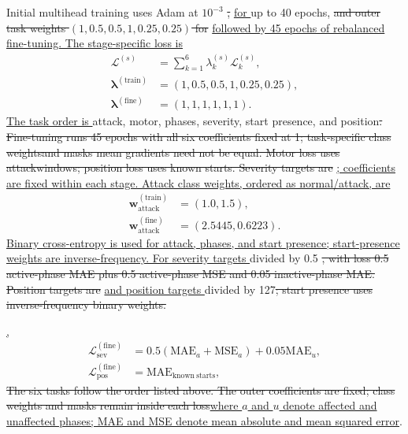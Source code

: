 \documentclass[conference,letterpaper]{IEEEtran}
\providecommand{\DIFadd}[1]{{\protect\color{blue}\uline{#1}}} %
\providecommand{\DIFdel}[1]{{\protect\color{red}\sout{#1}}}                      %
\providecommand{\DIFaddbegin}{} %
\providecommand{\DIFaddend}{} %
\providecommand{\DIFdelbegin}{} %
\providecommand{\DIFdelend}{} %
\begin{document}
Initial multihead training uses Adam at $10^{-3}$ \DIFdelbegin \DIFdel{, }\DIFdelend \DIFaddbegin \DIFadd{for }\DIFaddend up to 40 epochs, \DIFdelbegin \DIFdel{and outer task weights $(1,0.5,0.5,1,0.25,0.25)$ for }\DIFdelend \DIFaddbegin \DIFadd{followed by 45 epochs of rebalanced fine-tuning. The stage-specific loss is
}\begin{equation}
\begin{aligned}
\mathcal{L}^{(s)} &= \sum_{k=1}^{6}\lambda_k^{(s)}\mathcal{L}_k^{(s)},\\
\boldsymbol{\lambda}^{(\mathrm{train})} &= (1,0.5,0.5,1,0.25,0.25),\\
\boldsymbol{\lambda}^{(\mathrm{fine})} &= (1,1,1,1,1,1).
\end{aligned}
\label{eq:multitask_loss}
\end{equation}
\DIFadd{The task order is }\DIFaddend attack, motor, phases, severity, start presence, and position\DIFdelbegin \DIFdel{. Fine-tuning runs 45 epochs with all six coefficients fixed at 1; task-specific class weightsand masks mean gradients need not be equal. Motor loss uses attackwindows; position loss uses known starts. Severity targets are }\DIFdelend \DIFaddbegin \DIFadd{; coefficients are fixed within each stage. Attack class weights, ordered as normal/attack, are
}\begin{equation}
\begin{aligned}
\mathbf{w}_{\mathrm{attack}}^{(\mathrm{train})} &= (1.0,1.5),\\
\mathbf{w}_{\mathrm{attack}}^{(\mathrm{fine})} &= (2.5445,0.6223).
\end{aligned}
\label{eq:attack_weights}
\end{equation}
\DIFadd{Binary cross-entropy is used for attack, phases, and start presence; start-presence weights are inverse-frequency. For severity targets }\DIFaddend divided by 0.5 \DIFdelbegin \DIFdel{, with loss 0.5 active-phase MAE plus 0.5 active-phase MSE and 0.05 inactive-phase MAE. Position targets are }\DIFdelend \DIFaddbegin \DIFadd{and position targets }\DIFaddend divided by 127\DIFdelbegin \DIFdel{; start presence uses inverse-frequency binary weights.
}%

\DIFdelend \DIFaddbegin \DIFadd{,
}\begin{equation}
\begin{aligned}
\mathcal{L}_{\mathrm{sev}}^{(\mathrm{fine})} &= 0.5(\mathrm{MAE}_{a}+\mathrm{MSE}_{a})+0.05\mathrm{MAE}_{u},\\
\mathcal{L}_{\mathrm{pos}}^{(\mathrm{fine})} &= \mathrm{MAE}_{\mathrm{known\ starts}},
\end{aligned}
\end{equation}\DIFaddend
\DIFdelbegin \DIFdel{The six tasks follow the order listed above. The outer coefficients are fixed; class weights and masks remain inside each loss}\DIFdelend \DIFaddbegin \DIFadd{where $a$ and $u$ denote affected and unaffected phases; MAE and MSE denote mean absolute and mean squared error}\DIFaddend .
\end{document}
